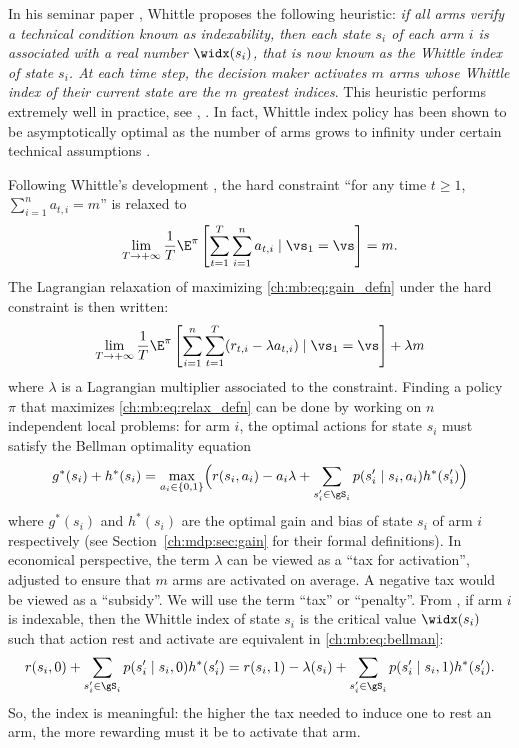 In his seminar paper \cite{whittle1988restless}, Whittle proposes the following heuristic: \textit{if all arms verify a technical condition known as indexability, then each state $s_i$ of each arm $i$ is associated with a real number $\widx(s_i)$, that is now known as the Whittle index of state $s_i$.
At each time step, the decision maker activates $m$ arms whose Whittle index of their current state are the $m$ greatest indices}.
This heuristic performs extremely well in practice, see \eg, \cite{glazebrook2002index, ansell2003whittle, glazebrook2006some}.
In fact, Whittle index policy has been shown to be asymptotically optimal as the number of arms grows to infinity under certain technical assumptions \cite{weber1990index, lott2000optimality, verloop2016asymptotically}.

Following Whittle's development \cite{whittle1988restless}, the hard constraint ``for any time $t\ge1$, $\sum_{i=1}^{n}a_{t,i}=m$'' is relaxed to
\begin{align*}
    \lim_{T\to+\infty}\frac1T \E^\pi\left[\sum_{t=1}^{T} \sum_{i=1}^n a_{t,i} \mid \vs_1=\vs\right]=m.
\end{align*}
The Lagrangian relaxation of maximizing \eqref{ch:mb:eq:gain_defn} under the hard constraint is then written:
\begin{align}
    \lim_{T\to+\infty}\frac1T \E^\pi\left[\sum_{i=1}^n \sum_{t=1}^{T} (r_{t,i} -\lambda a_{t,i}) \mid \vs_1=\vs\right] +\lambda m \label{ch:mb:eq:relax_defn}
\end{align}
where $\lambda$ is a Lagrangian multiplier associated to the constraint.
Finding a policy $\pi$ that maximizes \eqref{ch:mb:eq:relax_defn} can be done by working on $n$ independent local problems:
for arm $i$, the optimal actions for state $s_i$ must satisfy the Bellman optimality equation
\begin{align}
    g^*(s_i) +h^*(s_i) =\max_{a_i\in\{0,1\}} \Bigl(r(s_i,a_i)-a_i\lambda +\sum_{s'_i\in\gS_i}p(s'_i\mid s_i,a_i)h^*(s'_i)\Bigr) \label{ch:mb:eq:bellman}
\end{align}
where $g^*(s_i)$ and $h^*(s_i)$ are the optimal gain and bias of state $s_i$ of arm $i$ respectively (see Section~\ref{ch:mdp:sec:gain} for their formal definitions).
In economical perspective, the term $\lambda$ can be viewed as a ``tax for activation'', adjusted to ensure that $m$ arms are activated on average.
A negative tax would be viewed as a ``subsidy''.
We will use the term ``tax'' or ``penalty''.
From \cite{whittle1988restless,whittle1996optimal}, if arm $i$ is indexable, then the Whittle index of state $s_i$ is the critical value $\widx(s_i)$ such that action rest and activate are equivalent in \eqref{ch:mb:eq:bellman}:
\begin{align}
    r(s_i,0) +\sum_{s'_i\in\gS_i}p(s'_i\mid s_i,0)h^*(s'_i)
    =r(s_i,1)-\lambda(s_i) +\sum_{s'_i\in\gS_i}p(s'_i\mid s_i,1)h^*(s'_i). \label{ch:mb:eq:widx_defn}
\end{align}
So, the index is meaningful: the higher the tax needed to induce one to rest an arm, the more rewarding must it be to activate that arm.

